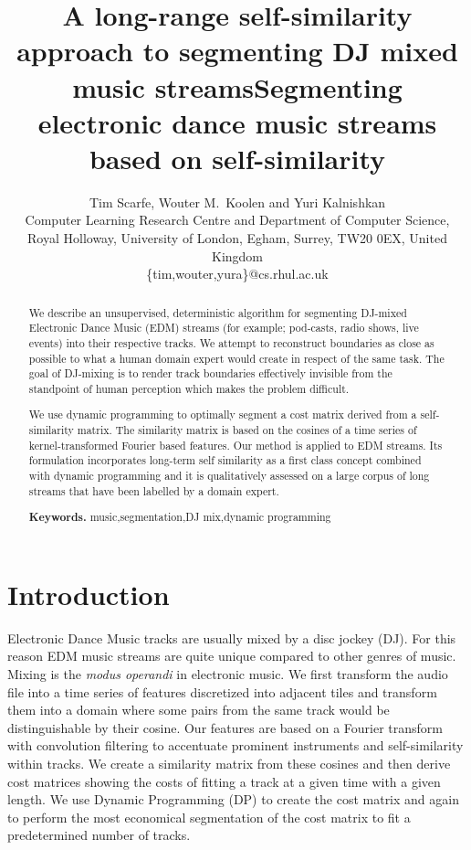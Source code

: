 \documentclass[twocolumn]{article}
\title{
A long-range self-similarity approach to segmenting DJ mixed music streams}
\author{Tim Scarfe, Wouter M.~Koolen and Yuri Kalnishkan \\ 
Computer Learning Research
 Centre and Department of Computer Science, \\ 
Royal Holloway,  University of London, Egham, Surrey, TW20 0EX, United Kingdom\\
\{tim,wouter,yura\}@cs.rhul.ac.uk
}
\title{Segmenting electronic dance music streams based on self-similarity}
\begin{document}
\maketitle

\begin{abstract}

We describe an unsupervised, deterministic algorithm for segmenting DJ-mixed Electronic Dance Music (EDM) streams (for example; pod-casts, radio shows, live events) into their respective tracks. We attempt to reconstruct boundaries as close as possible to what a human domain expert would create in respect of the same task. The goal of DJ-mixing is to render track boundaries effectively invisible from the standpoint of human perception which makes the problem difficult.

We use dynamic programming to optimally segment a cost matrix derived from a self-similarity matrix. The similarity matrix is based on the cosines of a time series of kernel-transformed Fourier based features. Our method is applied to EDM streams. Its formulation incorporates long-term self similarity as a first class concept combined with dynamic programming and it is qualitatively assessed on a large corpus of long streams that have been labelled by a domain expert.
\smallskip

\noindent \textbf{Keywords.} \noindent music,segmentation,DJ mix,dynamic programming

\end{abstract}


\vspace{1em}

\section{Introduction}

Electronic Dance Music tracks are usually mixed by a disc jockey (DJ). For this reason EDM music streams are quite unique compared to other genres of music. Mixing is the \textit{modus operandi} in electronic music. We first transform the audio file into a time series of features discretized into adjacent tiles and transform them into a domain where some pairs from the same track would be distinguishable by their cosine. Our features are based on a Fourier transform with convolution filtering to accentuate prominent instruments and self-similarity within tracks. We create a similarity matrix from these cosines and then derive cost matrices showing the costs of fitting a track at a given time with a given length. We use Dynamic Programming (DP) to create the cost matrix and again to perform the most economical segmentation of the cost matrix to fit a predetermined number of tracks.
\end{document}
